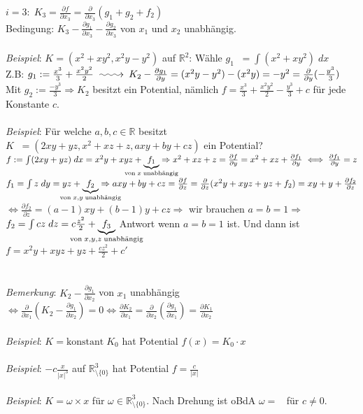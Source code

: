 \documentclass[12pt,a4paper,titlepage]{article}
\makeatletter
\newcommand{\longsquiggly}{\xymatrix{{}\ar@{~>}[r]&{}}}
\renewcommand{\d}{\partial}
\newcommand{\setR}{\mathbb{R}}
\newcommand{\twovec}[2]{\mathop{\left(\substack{#1 \\ #2}\right)}}
\newcommand{\threevec}[3]{\mathop{\left(\substack{#1 \\ #2 \\ #3}\right)}}
\makeatother
\begin{document}
$i=3:\; K_3=\frac{\d f}{\d x_3}=\frac{\d}{\d x_3}(g_1+g_2+f_2)$ \\
Bedingung: $K_3-\frac{\d g_1}{\d x_3}-\frac{\d g_2}{\d x_3}$ von $x_1$ und $x_2$ unabhängig. \\
\\
\textit{Beispiel}: $K=(x^2+xy^2,x^2y-y^2)$ auf $\setR^2$: Wähle $g_1\twovec{x}{y}=\int(x^2+xy^2) \;dx$ \\
Z.B: $g_1:=\frac{x^3}{3}+\frac{x^2y^2}{2} \longsquiggly K_2-\frac{\d g_1}{\d y}=(x^2y-y^2)-(x^2y)=-y^2 = \frac{\d}{\d y}(-\frac{y^3}{3})$ \\
Mit $g_2:=\frac{-y^3}{3} \Rightarrow K_2$ besitzt ein Potential, nämlich $f=\frac{x^3}{3}+\frac{x^2y^2}{2}-\frac{y^3}{3}+c$ für jede Konstante $c$. \\
\\
\textit{Beispiel}: Für welche $a,b,c\in\setR$ besitzt $K\threevec{x}{y}{z}=(2xy+yz,x^2+xz+z,axy+by+cz)$ ein Potential? \\
$f:=\int(2xy+yz) \;dx=x^2y+xyz+\underbrace{f_1}_{\mathclap{\text{von}\;x\;\text{unabhängig}}} \Rightarrow x^2+xz+z=\frac{\d f}{\d y}=x^2+xz+\frac{\d f_1}{\d y} \iff \frac{\d f_1}{\d y}=z$ \\
$f_1=\int z \;dy = yz+\underbrace{f_2}_{\mathclap{\text{von}\;x,y\;\text{unabhängig}}} \Rightarrow axy+by+cz=\frac{\d f}{\d z}=\frac{\d}{\d z}(x^2y+xyz+yz+f_2) = xy+y+\frac{\d f_2}{\d z}$ \\
$\iff \frac{\d f_2}{\d z}=(a-1)xy+(b-1)y+cz \Rightarrow$ wir brauchen $a=b=1 \Rightarrow $ \\
$f_2=\int cz\;dz=c\frac{z^2}{2}+\underbrace{f_3}_{\mathclap{\text{von}\;x,y,z\;\text{unabhängig}}}$ Antwort wenn $a=b=1$ ist. Und dann ist $f=x^2y+xyz+yz+\frac{cz^2}{2}+c'$ \\
\\
\\
\textit{Bemerkung}: $K_2-\frac{\d g_1}{\d x_2}$ von $x_1$ unabhängig $\iff \frac{\d}{\d x_1}(K_2-\frac{\d g_1}{\d x_2})=0 \iff \frac{\d K_2}{\d x_1}=\frac{\d}{\d x_2}(\frac{\d g_1}{\d x_1})=\frac{\d K_1}{\d x_2}$ \\
\\
\textit{Beispiel}: $K=\text{konstant}\;K_0$ hat Potential $f(x)=K_0\cdot x$ \\
\\
\textit{Beispiel}: $-c\frac{x}{|x|^3}$ auf $\setR^3_{\setminus\{0\}}$ hat Potential $f=\frac{c}{|x|}$ \\
\\
\textit{Beispiel}: $K=\omega\times x$ für $\omega\in\setR^3_{\setminus\{0\}}$. Nach Drehung ist oBdA $\omega=\threevec{0}{0}{0}$ für $c\neq 0$. \\
\end{document}
